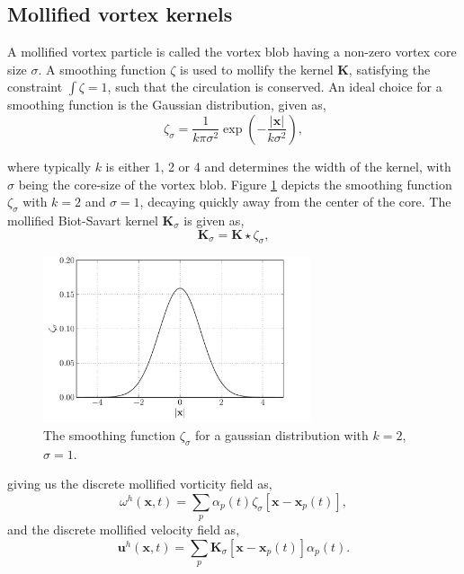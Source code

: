 \subsection{Mollified vortex kernels}

A mollified vortex particle is called the vortex blob having a non-zero vortex core size $\sigma$. A smoothing function $\zeta$ is used to mollify the kernel $\mathbf{K}$, satisfying the constraint $\int \zeta = 1$, such that the circulation is conserved. An ideal choice for a smoothing function is the Gaussian distribution, given as,
	\begin{equation}
	\zeta_{\sigma} = \frac{1}{k\pi\sigma^2}\exp\left(-\frac{\left|\mathbf{x}\right|}{k\sigma^2}\right),
	\end{equation}

where typically $k$ is either 1, 2 or 4 and determines the width of the kernel, with $\sigma$ being the core-size of the vortex blob. Figure \ref{fig:gaussianDistribution} depicts the smoothing function $\zeta_{\sigma}$ with $k=2$ and $\sigma = 1$, decaying quickly away from the center of the core. The mollified Biot-Savart kernel $\mathbf{K}_{\sigma}$ is given as,	 
	\begin{equation}
	\mathbf{K}_{\sigma} = \mathbf{K} \star \zeta_{\sigma}, 
	\end{equation}

	\begin{figure}[t]
	\centering
	\includegraphics[width=0.7\textwidth]{figures/lagrangian/gaussianKernel.pdf}
	\caption{The smoothing function $\zeta_{\sigma}$ for a gaussian distribution with $k=2$, $\sigma=1$.}
	\label{fig:gaussianDistribution}
	\end{figure}

giving us the discrete mollified vorticity field as,
	\begin{equation}
	\omega^h\left(\mathbf{x},t\right) = \sum_p \alpha_p\left(t\right)\zeta_{\sigma}\left[\mathbf{x}-\mathbf{x}_p\left(t\right)\right],
	\label{eq:mollifiedVorticityField}
	\end{equation}
and the discrete mollified velocity field as,
	\begin{equation}
	\mathbf{u}^h\left(\mathbf{x},t\right) = \sum_p \mathbf{K}_{\sigma}\left[\mathbf{x}-\mathbf{x}_p\left(t\right)\right]\alpha_p\left(t\right).
	\end{equation}

